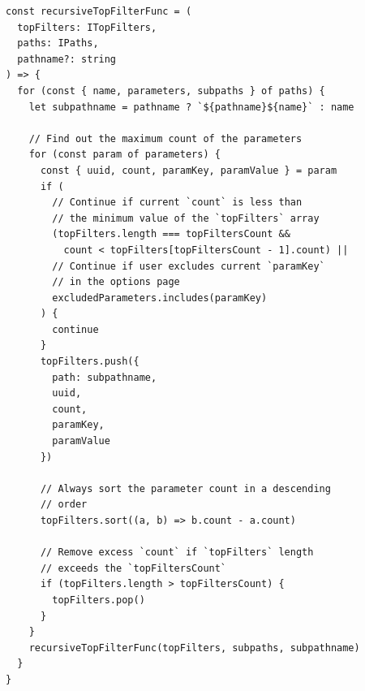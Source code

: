 \begin{lstlisting}[style=ES6, caption={Recursive function to fetch the top filters (TypeScript)}, label={lst:recursiveTopFiltersFunc}]
const recursiveTopFilterFunc = (
  topFilters: ITopFilters,
  paths: IPaths,
  pathname?: string
) => {
  for (const { name, parameters, subpaths } of paths) {
    let subpathname = pathname ? `${pathname}${name}` : name

    // Find out the maximum count of the parameters
    for (const param of parameters) {
      const { uuid, count, paramKey, paramValue } = param
      if (
        // Continue if current `count` is less than
        // the minimum value of the `topFilters` array
        (topFilters.length === topFiltersCount &&
          count < topFilters[topFiltersCount - 1].count) ||
        // Continue if user excludes current `paramKey`
        // in the options page
        excludedParameters.includes(paramKey)
      ) {
        continue
      }
      topFilters.push({
        path: subpathname,
        uuid,
        count,
        paramKey,
        paramValue
      })

      // Always sort the parameter count in a descending
      // order
      topFilters.sort((a, b) => b.count - a.count)

      // Remove excess `count` if `topFilters` length
      // exceeds the `topFiltersCount`
      if (topFilters.length > topFiltersCount) {
        topFilters.pop()
      }
    }
    recursiveTopFilterFunc(topFilters, subpaths, subpathname)
  }
}
\end{lstlisting}
